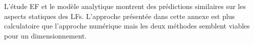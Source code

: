 L'étude EF et le modèle analytique montrent des prédictions similaires sur les aspects statiques des LFs. L'approche présentée dans cette annexe est plus calculatoire que l'approche numérique mais les deux méthodes semblent viables pour un dimensionnement.
		


 
